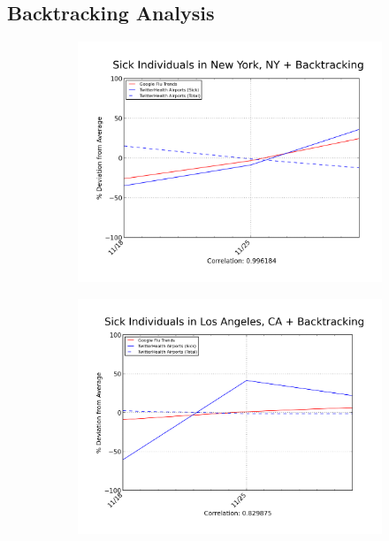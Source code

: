 \documentclass[11pt, letterpaper]{article}
\begin{document}
        \subsection{Backtracking Analysis}
            \begin{figure}[t!]
                \begin{center}
                    \begin{subfigure}[t]{0.45\textwidth}
                        \includegraphics[width=\textwidth]{../plot/figures/JFK_idev_2012-12-16.png}
                    \end{subfigure}
                    \begin{subfigure}[t]{0.45\textwidth}
                        \includegraphics[width=\textwidth]{../plot/figures/LAX_idev_2012-12-17.png}

\end{subfigure}
\end{center}
\end{figure}
\end{document}
